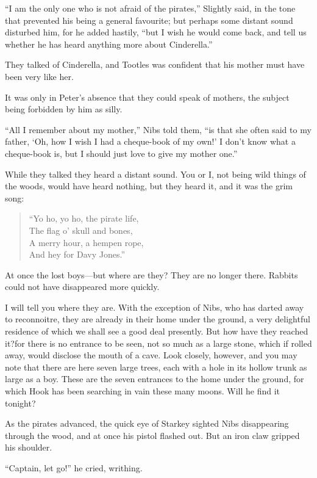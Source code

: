 “I am the only one who is not afraid of the pirates,” Slightly said,
in the tone that prevented his being a general favourite;
but perhaps some distant sound disturbed him, for he added hastily,
“but I wish he would come back, and tell us whether he has heard anything more about Cinderella.”

They talked of Cinderella, and Tootles was confident that his mother must have been very like her.

It was only in Peter’s absence that they could speak of mothers,
the subject being forbidden by him as silly.

“All I remember about my mother,” Nibs told them,
“is that she often said to my father, ‘Oh, how I wish I had a cheque-book of my own!’
I don’t know what a cheque-book is, but I should just love to give my mother one.”

While they talked they heard a distant sound.
You or I, not being wild things of the woods, would have heard nothing,
but they heard it, and it was the grim song:

\begin{verse}
	“Yo ho, yo ho, the pirate life,\\
	The flag o’ skull and bones,\\
	A merry hour, a hempen rope,\\
	And hey for Davy Jones.”
\end{verse}

At once the lost boys—but where are they?
They are no longer there.
Rabbits could not have disappeared more quickly.

I will tell you where they are.
With the exception of Nibs, who has darted away to reconnoitre,
they are already in their home under the ground,
a very delightful residence of which we shall see a good deal presently.
But how have they reached it?\@ for there is no entrance to be seen,
not so much as a large stone, which if rolled away, would disclose the mouth of a cave.
Look closely, however, and you may note that there are here seven large trees,
each with a hole in its hollow trunk as large as a boy.
These are the seven entrances to the home under the ground,
for which Hook has been searching in vain these many moons.
Will he find it tonight?

As the pirates advanced, the quick eye of Starkey sighted Nibs disappearing through the wood,
and at once his pistol flashed out.
But an iron claw gripped his shoulder.

“Captain, let go!\@” he cried, writhing.

